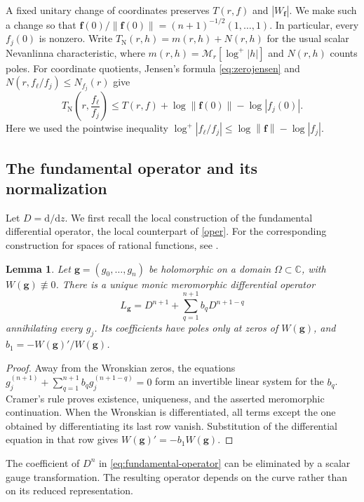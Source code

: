 \documentclass[11pt,letterpaper,reqno]{amsart}
\newtheorem{lem}[thm]{Lemma}
\theoremstyle{remark}
\numberwithin{equation}{section}
\newcommand{\C}{\mathbb C}
\newcommand{\TN}{T_{\mathrm N}}
\newcommand{\mean}[2]{\mathcal M_{#1}\!\left[#2\right]}
\newcommand{\norm}[1]{\left\lVert#1\right\rVert}
\newcommand{\fv}{\bm f}
\newcommand{\gv}{\bm g}
\begin{document}
A fixed unitary change of coordinates preserves $T(r,f)$ and $|W_{\fv}|$.
We make such a change so that $\fv(0)/\norm{\fv(0)}=(n+1)^{-1/2}(1,\ldots,1)$.
In particular, every $f_j(0)$ is nonzero. Write
$\TN(r,h)=m(r,h)+N(r,h)$ for the usual scalar Nevanlinna characteristic,
where $m(r,h)=\mean r{\log^+|h|}$ and $N(r,h)$ counts poles. For coordinate
quotients, Jensen's formula \eqref{eq:zerojensen} and
$N(r,f_\ell/f_j)\le N_{f_j}(r)$ give
\begin{equation}\label{eq:quotientbound}
 \TN\!\left(r,\frac{f_\ell}{f_j}\right)
 \le T(r,f)+\log\norm{\fv(0)}-\log|f_j(0)|.
\end{equation}
Here we used the pointwise inequality
$\log^+|f_\ell/f_j|\le\log\norm{\fv}-\log|f_j|$.

\subsection{The fundamental operator and its normalization}

Let $D=\mathrm d/\mathrm dz$. We first recall the local construction of the
fundamental differential operator, the local counterpart of \eqref{oper}.
For the corresponding construction for spaces of rational functions, see
\cite[Proposition~2.2]{Pur23}.

\begin{lem}\label{lem:fundamental-operator}
Let $\gv=(g_0,\ldots,g_n)$ be holomorphic on a domain $\Omega\subset\C$,
with $W(\gv)\not\equiv0$. There is a unique monic meromorphic differential
operator
\begin{equation}\label{eq:fundamental-operator}
 L_{\gv}=D^{n+1}+\sum_{q=1}^{n+1} b_qD^{n+1-q}
\end{equation}
annihilating every $g_j$. Its coefficients have poles only at zeros of
$W(\gv)$, and $b_1=-W(\gv)'/W(\gv)$.
\end{lem}
\begin{proof}
Away from the Wronskian zeros, the equations
$g_j^{(n+1)}+\sum_{q=1}^{n+1} b_qg_j^{(n+1-q)}=0$ form an invertible linear system
for the $b_q$. Cramer's rule proves existence, uniqueness, and the asserted
meromorphic continuation. When the Wronskian is differentiated, all terms
except the one obtained by differentiating its last row vanish. Substitution
of the differential equation in that row gives
$W(\gv)'=-b_1W(\gv)$.
\end{proof}

The coefficient of $D^{n}$ in \eqref{eq:fundamental-operator} can be eliminated by a scalar gauge
transformation. The resulting operator depends on the curve rather than on
its reduced representation.
\end{document}
